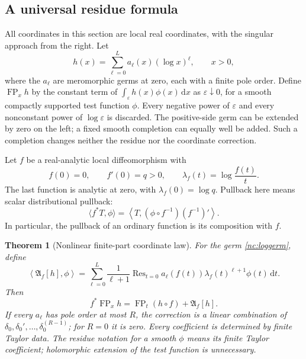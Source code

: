 \documentclass[11pt,a4paper]{article}
\numberwithin{equation}{section}
\newtheorem{theorem}{Theorem}[section]
\theoremstyle{definition}
\theoremstyle{remark}
\DeclareMathOperator{\FP}{FP}
\DeclareMathOperator{\Res}{Res}
\newcommand{\dd}{\,\mathrm d}
\newcommand{\eps}{\varepsilon}
\begin{document}
\subsection{A universal residue formula}

All coordinates in this section are local real coordinates, with the
singular approach from the right. Let
\begin{equation}\label{nc:loggerm}
 h(x)=\sum_{\ell=0}^{L}a_\ell(x)(\log x)^\ell,\qquad x>0,
\end{equation}
where the $a_\ell$ are meromorphic germs at zero, each with a finite pole
order. Define $\FP_xh$ by the constant term of
$\int_\eps h(x)\phi(x)\dd x$ as $\eps\downarrow0$, for a smooth
compactly supported test function $\phi$. Every negative power of
$\eps$ and every nonconstant power of $\log\eps$ is discarded.
The positive-side germ can be extended by zero on the left; a fixed
smooth completion can equally well be added. Such a completion changes
neither the residue nor the coordinate correction.

Let $f$ be a real-analytic local diffeomorphism with
\begin{equation}\label{nc:coordinate}
 f(0)=0,\qquad f'(0)=q>0,
 \qquad \lambda_f(t)=\log\frac{f(t)}t.
\end{equation}
The last function is analytic at zero, with
$\lambda_f(0)=\log q$. Pullback here means scalar distributional
pullback:
\begin{equation}\label{nc:pullback}
 \langle f^*T,\phi\rangle
 =\left\langle T,
       (\phi\circ f^{-1})(f^{-1})'\right\rangle.
\end{equation}
In particular, the pullback of an ordinary function is its composition
with $f$.

\begin{theorem}[Nonlinear finite-part coordinate law]
\label{nc:universal}
For the germ \eqref{nc:loggerm}, define
\begin{equation}\label{nc:residue-anomaly}
 \left\langle\mathfrak A_f[h],\phi\right\rangle
 =\sum_{\ell=0}^{L}\frac1{\ell+1}
  \Res_{t=0}
    a_\ell(f(t))\lambda_f(t)^{\ell+1}\phi(t)\dd t.
\end{equation}
Then
\begin{equation}\label{nc:universal-law}
 \boxed{\quad
 f^*\FP_xh=\FP_t(h\circ f)+\mathfrak A_f[h].
 \quad}
\end{equation}
If every $a_\ell$ has pole order at most $R$, the correction is a
linear combination of
$\delta_0,\delta_0',\ldots,\delta_0^{(R-1)}$; for $R=0$ it is zero.
Every coefficient is determined by finite Taylor data. The residue
notation for a smooth $\phi$ means its finite Taylor coefficient;
holomorphic extension of the test function is unnecessary.
\end{theorem}
\end{document}
